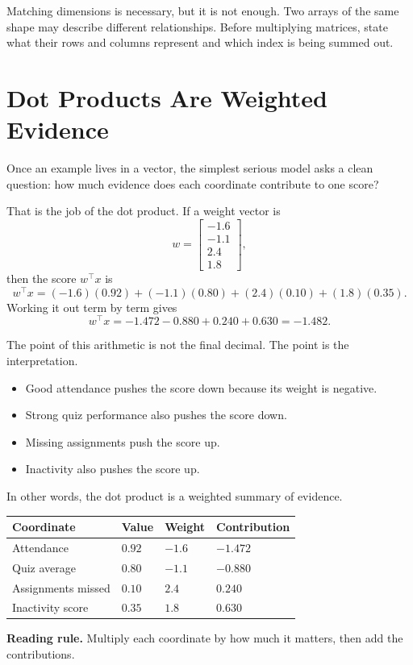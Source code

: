 Matching dimensions is necessary, but it is not enough. Two arrays of the same shape may describe different relationships. Before multiplying matrices, state what their rows and columns represent and which index is being summed out.

\section*{Dot Products Are Weighted Evidence}

Once an example lives in a vector, the simplest serious model asks a clean question: how much evidence does each coordinate contribute to one score?

That is the job of the dot product. If a weight vector is
\[
w =
\begin{bmatrix}
-1.6 \\
-1.1 \\
2.4 \\
1.8
\end{bmatrix},
\]
then the score \(w^\top x\) is
\[
w^\top x = (-1.6)(0.92) + (-1.1)(0.80) + (2.4)(0.10) + (1.8)(0.35).
\]
Working it out term by term gives
\[
w^\top x = -1.472 - 0.880 + 0.240 + 0.630 = -1.482.
\]

The point of this arithmetic is not the final decimal. The point is the interpretation.

\begin{itemize}[leftmargin=*]
\item Good attendance pushes the score down because its weight is negative.
\item Strong quiz performance also pushes the score down.
\item Missing assignments push the score up.
\item Inactivity also pushes the score up.
\end{itemize}

In other words, the dot product is a weighted summary of evidence.

\begin{center}
\small
\begin{tabular}{p{2.73cm}p{1.82cm}p{1.82cm}p{2.73cm}}
\toprule
Coordinate & Value & Weight & Contribution \\
\midrule
Attendance & \(0.92\) & \(-1.6\) & \(-1.472\) \\
Quiz average & \(0.80\) & \(-1.1\) & \(-0.880\) \\
Assignments missed & \(0.10\) & \(2.4\) & \(0.240\) \\
Inactivity score & \(0.35\) & \(1.8\) & \(0.630\) \\
\bottomrule
\end{tabular}

\medskip
\noindent\textbf{Reading rule.} Multiply each coordinate by how much it matters, then add the contributions.
\end{center}

